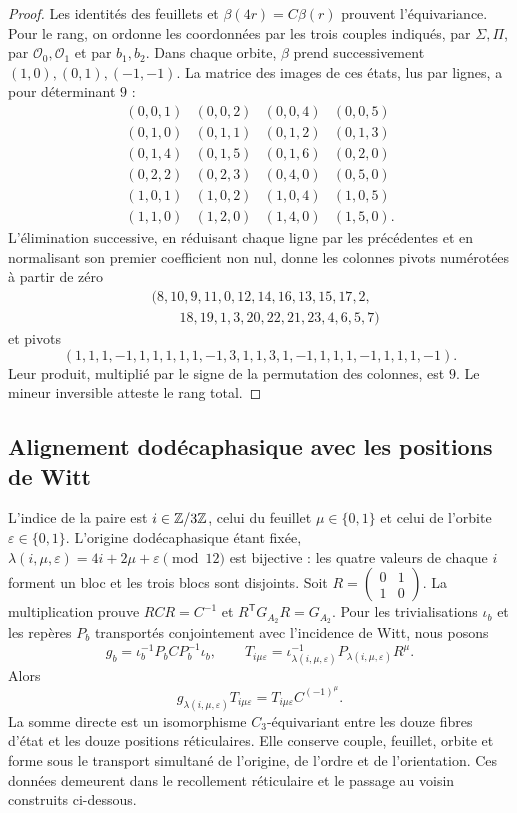 \begin{proof}
Les identités des feuillets et \(\beta(4r)=C\beta(r)\) prouvent
l’équivariance. Pour le rang, on ordonne les coordonnées par les trois
couples indiqués, par \(\Sigma,\Pi\), par \(\mathcal O_0,\mathcal O_1\)
et par \(b_1,b_2\). Dans chaque orbite, \(\beta\) prend successivement
\((1,0),(0,1),(-1,-1)\). La matrice des images de ces états,
lus par lignes, a pour déterminant \(9\) :
\[
\begin{array}{rrrr}
(0,0,1)&(0,0,2)&(0,0,4)&(0,0,5)\\
(0,1,0)&(0,1,1)&(0,1,2)&(0,1,3)\\
(0,1,4)&(0,1,5)&(0,1,6)&(0,2,0)\\
(0,2,2)&(0,2,3)&(0,4,0)&(0,5,0)\\
(1,0,1)&(1,0,2)&(1,0,4)&(1,0,5)\\
(1,1,0)&(1,2,0)&(1,4,0)&(1,5,0).
\end{array}
\]
L'élimination successive, en réduisant chaque ligne par les précédentes et en normalisant son premier coefficient non nul, donne les colonnes pivots numérotées à partir de zéro
\[
\begin{split}
&(8,10,9,11,0,12,14,16,13,15,17,2,\\
&\hspace{2em}18,19,1,3,20,22,21,23,4,6,5,7)
\end{split}
\]
et pivots
\[
(1,1,1,-1,1,1,1,1,1,-1,3,1,1,3,1,-1,1,1,1,-1,1,1,1,-1).
\]
Leur produit, multiplié par le signe de la permutation des colonnes,
est \(9\). Le mineur inversible atteste le rang total.
\end{proof}

\subsection{Alignement dodécaphasique avec les positions de Witt}
\label{nuclear:alineamiento-witt}
L'indice de la paire est \(i\in\mathbb Z/3\mathbb Z\), celui du feuillet \(\mu\in\{0,1\}\) et celui de l'orbite \(\varepsilon\in\{0,1\}\). L'origine dodécaphasique étant fixée, \(\lambda(i,\mu,\varepsilon)
=4i+2\mu+\varepsilon\pmod{12}\) est bijective : les quatre valeurs de chaque \(i\) forment un bloc et les trois blocs sont disjoints. Soit \(R=\left(\begin{smallmatrix}0&1\\1&0\end{smallmatrix}\right)\).
La multiplication prouve \(RCR=C^{-1}\) et
\(R^{\mathsf T}G_{A_2}R=G_{A_2}\). Pour les trivialisations
\(\iota_b\) et les repères \(P_b\) transportés conjointement avec
l’incidence de Witt, nous posons
\[
g_b=\iota_b^{-1}P_bCP_b^{-1}\iota_b,\qquad
T_{i\mu\varepsilon}=\iota_{\lambda(i,\mu,\varepsilon)}^{-1}
P_{\lambda(i,\mu,\varepsilon)}R^\mu.
\]
Alors
\[
g_{\lambda(i,\mu,\varepsilon)}T_{i\mu\varepsilon}
=T_{i\mu\varepsilon}C^{(-1)^\mu}.
\]
La somme directe est un isomorphisme \(C_3\)-équivariant entre les douze
fibres d’état et les douze positions réticulaires. Elle conserve couple,
feuillet, orbite et forme sous le transport simultané de l’origine,
de l’ordre et de l’orientation. Ces données demeurent dans le recollement réticulaire
et le passage au voisin construits ci-dessous.

